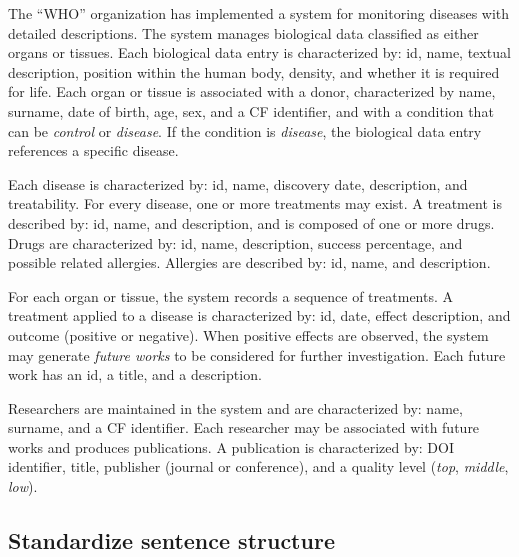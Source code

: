 \documentclass[11pt,a4paper]{article}
\begin{document}
The ``WHO'' organization has implemented a system for monitoring diseases with detailed descriptions. The system manages biological data classified as either organs or tissues. Each biological data entry is characterized by: id, name, textual description, position within the human body, density, and whether it is required for life. Each organ or tissue is associated with a donor, characterized by name, surname, date of birth, age, sex, and a CF identifier, and with a condition that can be \textit{control} or \textit{disease}. If the condition is \textit{disease}, the biological data entry references a specific disease.

Each disease is characterized by: id, name, discovery date, description, and treatability. For every disease, one or more treatments may exist. A treatment is described by: id, name, and description, and is composed of one or more drugs. Drugs are characterized by: id, name, description, success percentage, and possible related allergies. Allergies are described by: id, name, and description.

For each organ or tissue, the system records a sequence of treatments. A treatment applied to a disease is characterized by: id, date, effect description, and outcome (positive or negative). When positive effects are observed, the system may generate \textit{future works} to be considered for further investigation. Each future work has an id, a title, and a description.

Researchers are maintained in the system and are characterized by: name, surname, and a CF identifier. Each researcher may be associated with future works and produces publications. A publication is characterized by: DOI identifier, title, publisher (journal or conference), and a quality level (\textit{top}, \textit{middle}, \textit{low}).

\subsection{Standardize sentence structure}
\end{document}
